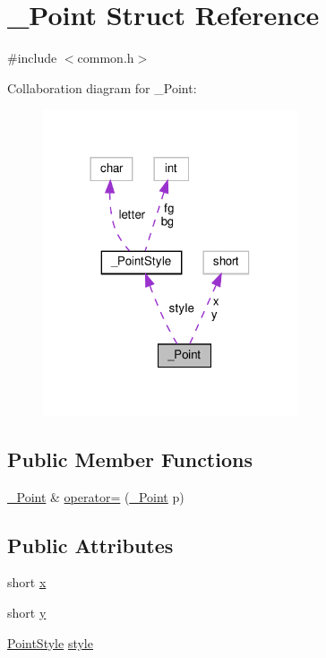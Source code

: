 \hypertarget{struct___point}{}\section{\+\_\+\+Point Struct Reference}
\label{struct___point}


{\ttfamily \#include $<$common.\+h$>$}



Collaboration diagram for \+\_\+\+Point\+:
\nopagebreak
\begin{figure}[H]
\begin{center}
\leavevmode
\includegraphics[width=213pt]{struct___point__coll__graph}
\end{center}
\end{figure}
\subsection*{Public Member Functions}
\begin{DoxyCompactItemize}
\item 
\mbox{\hyperlink{struct___point}{\+\_\+\+Point}} \& \mbox{\hyperlink{struct___point_acf5181d8cc6c6bd73a73aa1da2d980cb}{operator=}} (\mbox{\hyperlink{struct___point}{\+\_\+\+Point}} p)
\end{DoxyCompactItemize}
\subsection*{Public Attributes}
\begin{DoxyCompactItemize}
\item 
short \mbox{\hyperlink{struct___point_a1c1cb9f2bfc0c90f1079661912b69e48}{x}}
\item 
short \mbox{\hyperlink{struct___point_af63bdd5a8c2fcf3fc4701a1cc6a421df}{y}}
\item 
\mbox{\hyperlink{common_8h_afd9cb36d6ef309c77ea1e3177e19c623}{Point\+Style}} \mbox{\hyperlink{struct___point_af909fc976d09ac1f11878b4bdcfa10ca}{style}}
\end{DoxyCompactItemize}


